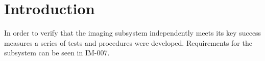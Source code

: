 \documentclass[]{auvsi_doc}
\begin{document}
\begin{AUVSITitlePage}
\begin{artifacttable}
\end{artifacttable}
\end{AUVSITitlePage}

\section{Introduction}

In order to verify that the imaging subsystem independently meets its key success
measures a series of tests and procedures were developed. Requirements for the subsystem
can be seen in IM-007.
\end{document}
